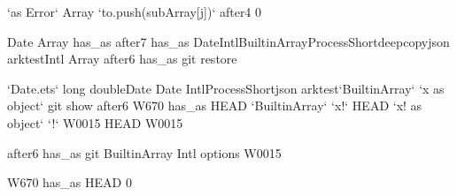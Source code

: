 \begin{decodedreasoningpanel}
 `as Error`    Array  `to.push(subArray[j])`  after4  0 

 Date  Array  has\_as  after7  has\_as  DateIntlBuiltinArrayProcessShortdeepcopyjson  arktestIntl  Array  after6  has\_as  git restore 

 `Date.ets` long doubleDate  Date  IntlProcessShortjson  arktest`BuiltinArray`  `x as object` git show  after6  W670 has\_as  HEAD `BuiltinArray`  `x!` HEAD  `x! as object` `!` W0015 HEAD  W0015

 after6  has\_as  git  BuiltinArray  Intl options  W0015

 W670 has\_as  HEAD  0
\end{decodedreasoningpanel}
